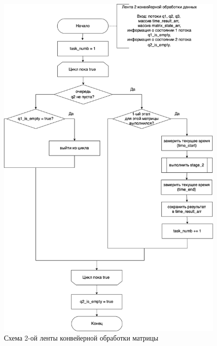 \begin{figure}[h]
	\centering
	\includegraphics[scale=0.5]{img/parallel_stage_2.png}
	\caption{Схема 2-ой ленты конвейерной обработки матрицы}
	\label{fig:parallel_stage_2}
\end{figure} 

\clearpage

